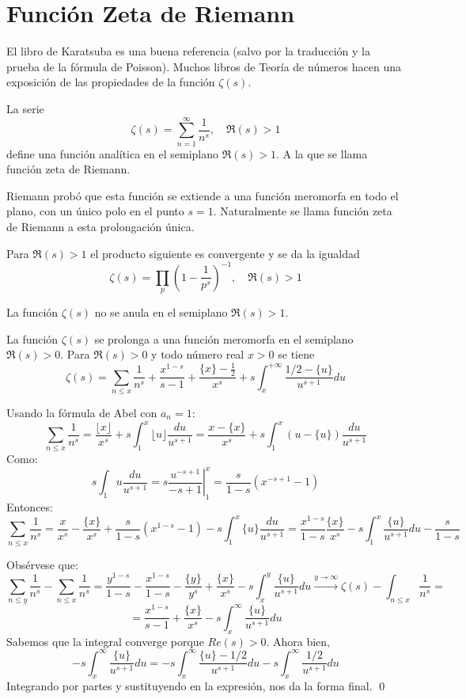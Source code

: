 \documentclass[TAN.tex]{subfiles}
\begin{document}
\section{Función Zeta de Riemann}
El libro de Karatsuba es una buena referencia (salvo por la traducción y la prueba de la fórmula de Poisson). Muchos libros de Teoría de números hacen una exposición de las propiedades de la función $ζ(s)$.
\begin{defi}
La serie
\[ ζ(s) = \sum_{n=1}^{∞} \frac{1}{n^s}, \quad \Re(s) > 1 \]
define una función analítica en el semiplano $\Re(s) > 1$. A la que se llama función zeta de Riemann.
\end{defi}
Riemann probó que esta función se extiende a una función meromorfa en todo el plano, con un único polo en el punto $s = 1$. Naturalmente se llama función zeta de Riemann a esta prolongación única.
\begin{teorema}
Para $\Re(s)>1$ el producto siguiente es convergente y se da la igualdad
\[ ζ(s) = \prod_p \left(1-\frac{1}{p^s}\right)^{-1}, \quad \Re(s) > 1 \]
\end{teorema}
\begin{coro}
La función $ζ(s)$ no se anula en el semiplano $\Re(s)>1$.
\end{coro}
\begin{teorema}
La función $ζ(s)$ se prolonga a una función meromorfa en el semiplano $\Re(s) > 0$. Para $\Re(s) > 0$ y todo número real $x > 0$ se tiene
\[ ζ(s) = \sum_{n ≤ x} \frac{1}{n^s} + \frac{x^{1-s}}{s-1} + \frac{\{x\}-\frac{1}{2}}{x^s} + s \int_x^{+∞} \frac{1/2-\{u\}}{u^{s+1}} du \]
\end{teorema}
\begin{dem}
Usando la fórmula de Abel con $a_n=1$:
\[ \sum_{n≤x} \frac{1}{n^s} = \frac{\lfloor x \rfloor}{x^s} + s\int_1^x \lfloor u \rfloor\frac{du}{u^{s+1}} = \frac{x-\{x\}}{x^s} + s \int_1^x (u-\{u\}) \frac{du}{u^{s+1}} \]
Como:
\[ s\int_1 u \frac{du}{u^{s+1}} = s \left.\frac{u^{-s+1}}{-s+1}\right|_1^x = \frac{s}{1-s}(x^{-s+1}-1) \]
Entonces:
\[ \sum_{n≤x} \frac{1}{n^s} = \frac{x}{x^s}-\frac{\{x\}}{x^s} + \frac{s}{1-s}(x^{1-s}-1)- s\int_1^x \{u\} \frac{du}{u^{s+1}} = \frac{x^{1-s}}{1-s}  \frac{\{x\}}{x^s} - s \int_1^x \frac{\{u\}}{u^{s+1}}du - \frac{s}{1-s} \]

Obsérvese que:
\[ \sum_{n≤y}\frac{1}{n^s} - \sum_{n≤x} \frac{1}{n^s} = \frac{y^{1-s}}{1-s} -\frac{x^{1-s}}{1-s}- \frac{\{y\}}{y^s} + \frac{\{x\}}{x^s} -s\int_x^y \frac{\{u\}}{u^{s+1}} du \xrightarrow{y \to ∞}ζ(s)-\int_{n≤x} \frac{1}{n^s} = \]
\[ = \frac{x^{1-s}}{s-1}+ \frac{\{x\}}{x^s} -s\int_x^{∞} \frac{\{u\}}{u^{s+1}}du \]
Sabemos que la integral converge porque $Re(s)>0$. Ahora bien,
\[ -s\int_x^∞ \frac{\{u\}}{u^{s+1}} du = -s\int_x^{∞} \frac{\{u\}-1/2}{u^{s+1}} du - s\int_x^{∞} \frac{1/2}{u^{s+1}} du \]
Integrando por partes y sustituyendo en la expresión, nos da la forma final.
\qed
\end{dem}
\end{document}
